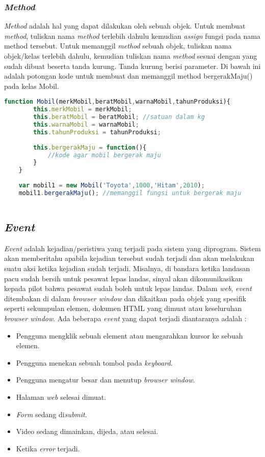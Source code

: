 \subsubsection{\textit{Method}}
\textit{Method} adalah hal yang dapat dilakukan oleh sebuah objek. Untuk membuat \textit{method}, tuliskan nama \textit{method} terlebih dahulu kemudian \textit{assign} fungsi pada nama method tersebut. Untuk memanggil \textit{method} sebuah objek, tuliskan nama objek/kelas terlebih dahulu, kemudian tuliskan nama \textit{method} sesuai dengan yang sudah dibuat beserta tanda kurung. Tanda kurung berisi parameter. Di bawah ini adalah potongan kode untuk membuat dan memanggil method bergerakMaju() pada kelas Mobil.

\begin{lstlisting}[language=Javascript, caption=Membuat dan memanggil method bergerakMaju()]
	function Mobil(merkMobil,beratMobil,warnaMobil,tahunProduksi){
		this.merkMobil = merkMobil;
		this.beratMobil = beratMobil; //satuan dalam kg
		this.warnaMobil = warnaMobil;
		this.tahunProduksi = tahunProduksi;
		
		this.bergerakMaju = function(){
			//kode agar mobil bergerak maju
		}
	}
	
	var mobil1 = new Mobil('Toyota',1000,'Hitam',2010);
	mobil1.bergerakMaju(); //memanggil fungsi untuk bergerak maju
	
\end{lstlisting}

\subsection{\textit{Event}}
\textit{Event} adalah kejadian/peristiwa yang terjadi pada sistem yang diprogram. Sistem akan memberitahu apabila kejadian tersebut sudah terjadi dan akan melakukan suatu aksi ketika kejadian sudah terjadi. Misalnya, di bandara ketika landasan pacu sudah bersih untuk pesawat lepas landas, sinyal akan dikomunikasikan kepada pilot bahwa pesawat sudah boleh untuk lepas landas. Dalam \textit{web}, \textit{event} ditembakan di dalam \textit{browser window} dan dikaitkan pada objek yang spesifik seperti sekumpulan elemen, dokumen HTML yang dimuat atau keseluruhan \textit{browser window}. Ada beberapa \textit{event} yang dapat terjadi diantaranya adalah : 

\begin{itemize}
	\item Pengguna mengklik sebuah element atau mengarahkan kursor ke sebuah elemen.
	\item Pengguna menekan sebuah tombol pada \textit{keyboard}.
	\item Pengguna mengatur besar dan menutup \textit{browser window}.
	\item Halaman \textit{web} selesai dimuat.
	\item \textit{Form} sedang di\textit{submit}.
	\item Video sedang dimainkan, dijeda, atau selesai.
	\item Ketika \textit{error} terjadi.
\end{itemize}


